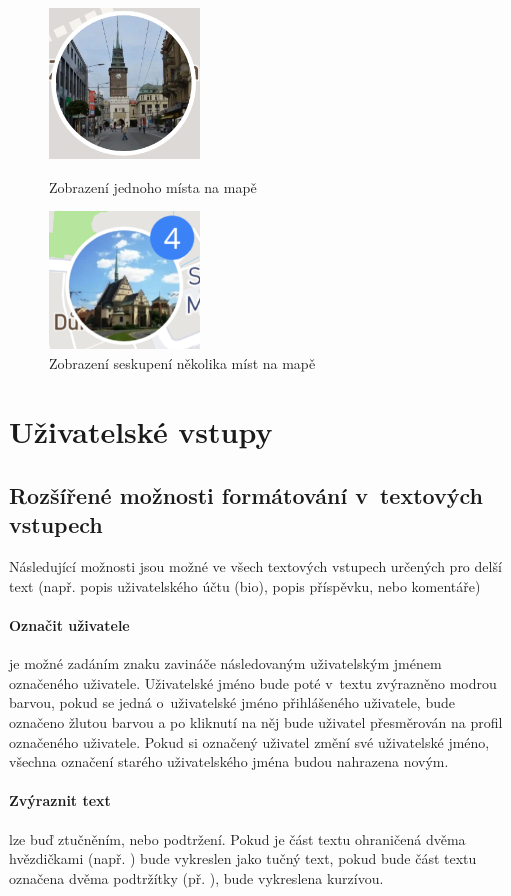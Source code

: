 \documentclass[12pt, a4paper,
  oneside,      %
]{report}
\begin{document}
\begin{figure}[!h]

	\centering
	\includegraphics[width=4cm]{images/place.png}
	\caption{Zobrazení jednoho místa na mapě}\label{figure:onePlaceOnMap}
	\includegraphics[width=4cm]{images/places_cluster.png}
	\caption{Zobrazení seskupení několika míst na mapě}\label{figure:clusterOnMap}

\end{figure}


\section{Uživatelské vstupy}
\subsection{Rozšířené možnosti formátování v~textových vstupech}
Následující možnosti jsou možné ve všech textových vstupech určených pro delší text (např. popis uživatelského účtu (bio), popis příspěvku, nebo komentáře)
\paragraph{Označit uživatele} je možné zadáním znaku zavináče následovaným uživatelským jménem označeného uživatele. Uživatelské jméno bude poté v~textu zvýrazněno modrou barvou, pokud se jedná o~uživatelské jméno přihlášeného uživatele, bude označeno žlutou barvou a po kliknutí na něj bude uživatel přesměrován na profil označeného uživatele. Pokud si označený uživatel změní své uživatelské jméno, všechna označení starého uživatelského jména budou nahrazena novým.
\paragraph{Zvýraznit text} lze buď ztučněním, nebo podtržení. Pokud je část textu ohraničená dvěma hvězdičkami (např. ) bude vykreslen jako tučný text, pokud bude část textu označena dvěma podtržítky (př. ), bude vykreslena kurzívou.
\end{document}
